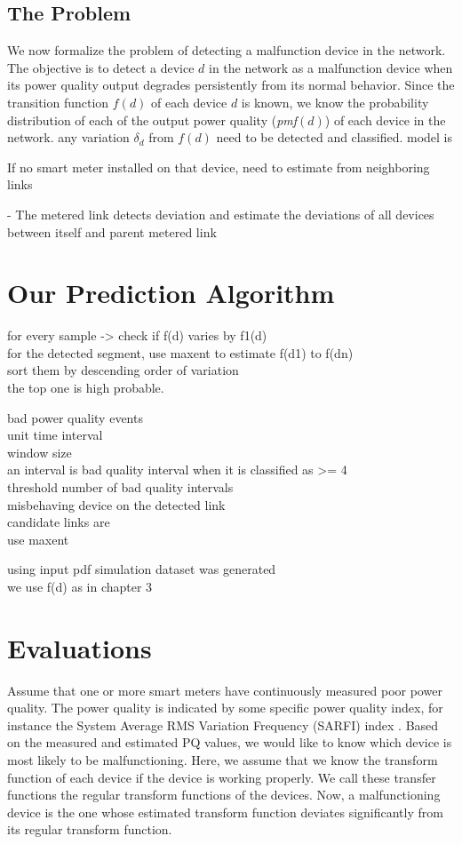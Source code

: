 \documentclass[12pt,oneside]{book}
\begin{document}
\subsection{The Problem}
We now formalize the problem of detecting a malfunction device in the network. The objective is to detect a device $d$ in the network as a malfunction device when its power quality output degrades persistently from its normal behavior. Since the transition function $f(d)$ of each device $d$ is known, we know the probability distribution of each of the output power quality (\emph{pmf}$\left(d\right)$) of each device in the network.   any variation $\delta_d$ from $f(d)$ need to be detected and classified. model is     

If no smart meter installed on that device, need to estimate from neighboring links

- The metered link detects deviation and estimate the deviations of all devices between itself and parent metered link


\section{Our Prediction Algorithm}
for every sample -> check if f(d) varies by f1(d)\\
for the detected segment, use maxent to estimate f(d1) to f(dn)\\
sort them by descending order of variation\\
the top one is high probable.

bad power quality events\\
unit time interval\\
window size\\
an interval is bad quality interval when it is classified as >= 4\\
threshold number of bad quality intervals\\
misbehaving device on the detected link\\
candidate links are\\
use maxent


using input pdf simulation dataset was generated\\
we use f(d) as in chapter 3


\section{Evaluations}
Assume that one or more smart meters have continuously measured poor power quality. The power quality is indicated by some specific power quality index, for instance the System Average RMS Variation Frequency (SARFI) index . Based on the measured and estimated PQ values, we would like to know which device is most likely to be malfunctioning. Here, we assume that we know the transform function of each device if the device is working properly. We call these transfer functions the regular transform functions of the devices. Now, a malfunctioning device is the one whose estimated transform function deviates significantly from its regular transform function.
\end{document}
